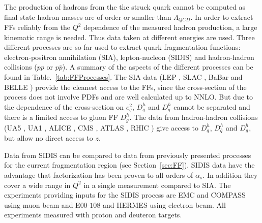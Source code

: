 The production of hadrons from the the struck quark cannot be computed as final state hadron masses are of order or smaller than $\Lambda_{QCD}$. In order to extract FFs reliably from the $Q^2$ dependence of the measured hadron production, a large kinematic range is needed. Thus data taken at different energies are used. Three different processes are so far used to extract quark fragmentation functions: electron-positron annihilation (SIA), lepton-nucleon (SIDIS) and hadron-hadron collisions ($pp$ or $p\bar{p}$). A summary of the aspects of the different processes can be found in Table.~\ref{tab:FFProcesses}. The SIA data (LEP \cite{LEP1,LEP2,LEP3}, SLAC \cite{SLAC1}, BaBar \cite{BABAR} and BELLE \cite{BELLE}) provide the cleanest access to the FFs, since the cross-section of the process does not involve PDFs and are well calculated up to NNLO. But due to the dependence of the cross-section on $e^2_q$, $D^h_q$ and $D^h_{\bar{q}}$ cannot be separated and there is a limited access to gluon FF $D^h_g$. The data from hadron-hadron collisions (UA5 \cite{UA5}, UA1 \cite{UA1}, ALICE \cite{ALICE}, CMS \cite{CMS1,CMS2}, ATLAS \cite{ATLAS}, RHIC \cite{RHIC1,RHIC2,RHIC3}) give access to $D^h_q$, $D^h_{\bar{q}}$ and $D^h_g$, but allow no direct access to $z$.

Data from SIDIS can be compared to data from previously presented processes for the current fragmentation region (see Section~\ref{sec:FF}). SIDIS data have the advantage that factorization has been proven to all orders of $\alpha_s$. In addition they cover a wide range in $Q^2$ in a single measurement compared to SIA. The experiments providing inputs for the SIDIS process are EMC \cite{EMC} and COMPASS \cite{COMPASS2006Pi,COMPASS2006K} using muon beam and E$00$-$108$ \cite{E00108} and HERMES \cite{HERMESMult} using electron beam. All experiments measured with proton and deuteron targets.

